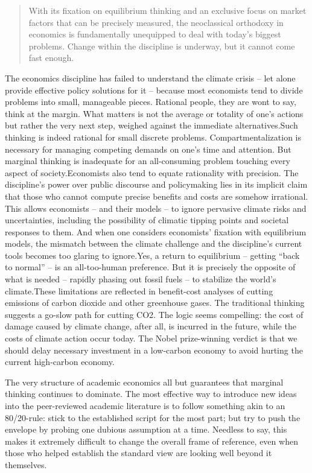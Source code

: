 \documentclass[
]{book}
\begin{document}
\begin{quote}
With its fixation on equilibrium thinking and an exclusive focus on market factors that can be precisely measured, the neoclassical orthodoxy in economics is fundamentally unequipped to deal with today's biggest problems. Change within the discipline is underway, but it cannot come fast enough.
\end{quote}

The economics discipline has failed to understand the climate crisis -- let alone provide effective policy solutions for it -- because most economists tend to divide problems into small, manageable pieces. Rational people, they are wont to say, think at the margin. What matters is not the average or totality of one's actions but rather the very next step, weighed against the immediate alternatives.Such thinking is indeed rational for small discrete problems. Compartmentalization is necessary for managing competing demands on one's time and attention. But marginal thinking is inadequate for an all-consuming problem touching every aspect of society.Economists also tend to equate rationality with precision. The discipline's power over public discourse and policymaking lies in its implicit claim that those who cannot compute precise benefits and costs are somehow irrational. This allows economists -- and their models -- to ignore pervasive climate risks and uncertainties, including the possibility of climatic tipping points and societal responses to them. And when one considers economists' fixation with equilibrium models, the mismatch between the climate challenge and the discipline's current tools becomes too glaring to ignore.Yes, a return to equilibrium -- getting ``back to normal'' -- is an all-too-human preference. But it is precisely the opposite of what is needed -- rapidly phasing out fossil fuels -- to stabilize the world's climate.These limitations are reflected in benefit-cost analyses of cutting emissions of carbon dioxide and other greenhouse gases. The traditional thinking suggests a go-slow path for cutting CO2. The logic seems compelling: the cost of damage caused by climate change, after all, is incurred in the future, while the costs of climate action occur today. The Nobel prize-winning verdict is that we should delay necessary investment in a low-carbon economy to avoid hurting the current high-carbon economy.

The very structure of academic economics all but guarantees that marginal thinking continues to dominate. The most effective way to introduce new ideas into the peer-reviewed academic literature is to follow something akin to an 80/20-rule: stick to the established script for the most part; but try to push the envelope by probing one dubious assumption at a time. Needless to say, this makes it extremely difficult to change the overall frame of reference, even when those who helped establish the standard view are looking well beyond it themselves.
\end{document}
